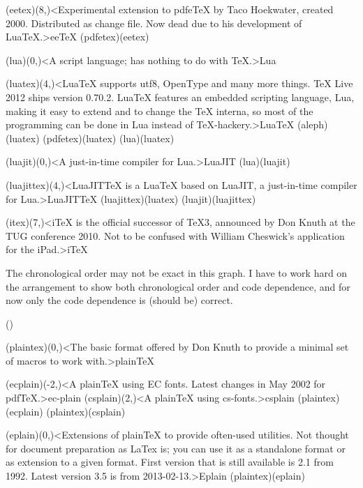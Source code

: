 {	\tonode[\experimental](eetex)(8,\layer)<Experimental extension to pdfeTeX by Taco Hoekwater, created 2000. Distributed as change file. Now dead due to his development of LuaTeX.>{ee\TeX}
		\todraw(pdfetex)(eetex)
	
	\steplayer[-1]

	\tonode[\program](lua)(0,\layer)<A script language; has nothing to do with TeX.>{Lua}
	
	\tonode[\vip](luatex)(4,\layer)<LuaTeX supports utf8, OpenType and many more things. TeX Live 2012 ships version 0.70.2. LuaTeX features an embedded scripting language, Lua, making it easy to extend and to change the TeX interna, so most of the programming can be done in Lua instead of TeX-hackery.>{Lua\TeX}
		\todraw(aleph)(luatex)
		\todraw*(pdfetex)(luatex)
		\todraw[dashed](lua)(luatex)

	\steplayer[-2]
	\tonode[\program](luajit)(0,\layer)<A just-in-time compiler for Lua.>{LuaJIT}
		\todraw(lua)(luajit)

	\tonode[\experimental](luajittex)(4,\layer)<LuaJITTeX is a LuaTeX based on LuaJIT, a just-in-time compiler for Lua.>{LuaJIT\TeX}
		\todraw(luajittex)(luatex)
		\todraw[dashed](luajit)(luajittex)

	\steplayer[-2.5]
	\tonode[\experimental](itex)(7,\layer)<iTeX is the official successor of TeX3, announced by Don Knuth at the TUG conference 2010. Not to be confused with William Cheswick's application for the iPad.>{i\TeX}
}
\vfill

{\flushleft The chronological order may not be exact in this graph. I have to work hard on the arrangement to show both chronological order and code dependence, and for now only the code dependence is (should be) correct.

} 

\clearpage

\tograph(){
	\tonode(plaintex)(0,\layer)<The basic format offered by Don Knuth to provide a minimal set of macros to work with.>{plain\TeX}
\steplayer[-2]

	\tonode[\experimental](ecplain)(-2,\layer)<A plainTeX using EC fonts. Latest changes in May 2002 for pdfTeX.>{ec-plain}
	\tonode[\experimental](csplain)(2,\layer)<A plainTeX using cs-fonts.>{csplain}
	\todraw(plaintex)(ecplain)
	\todraw(plaintex)(csplain)

\steplayer[-2]
	\tonode[\experimental](eplain)(0,\layer)<Extensions of plainTeX to provide often-used utilities. Not thought for document preparation as LaTex is; you can use it as a standalone format or as extension to a given format. First version that is still available is 2.1 from 1992. Latest version 3.5 is from 2013-02-13.>{Eplain}
	\todraw(plaintex)(eplain)
}
\clearpage

